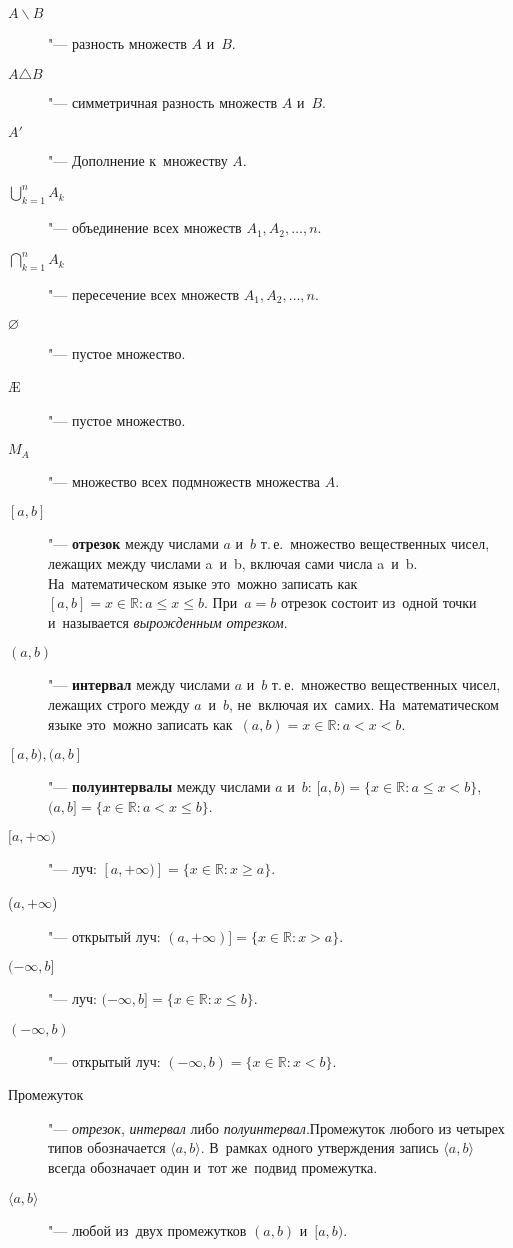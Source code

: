 \documentclass[]{scrartcl}
\begin{document}
\begin{description}
	\item[$A \backslash B$] "--- разность множеств $A$ и~$B$.
	\item[$A \triangle B$] "--- симметричная разность множеств $A$ и~$B$.
	\item[$A'$] "--- Дополнение к~множеству $A$.
	\item[$\bigcup \limits_{k=1}^{n}A_k$] "--- объединение всех множеств $A_1, A_2,\ldots, n$.
	\item[$\bigcap \limits_{k=1}^{n}A_k$] "--- пересечение всех множеств $A_1, A_2,\ldots, n$.
	\item[$\varnothing$] "--- пустое множество.
	\item[\AE{}] "--- пустое множество.
	\item[$M_A$] "--- множество всех подмножеств множества $A$.
	\item[{$\left[ a,b \right]$}] "--- \textbf{отрезок} между числами $a$ и~$b$ т.\,е.~множество вещественных чисел, лежащих между числами a~и~b, включая сами числа a~и~b. На~математическом языке это~можно записать как~$[a, b] = {x \in \mathbb{R}: a \leq x \leq b }$. При~$a=b$ отрезок состоит из~одной точки и~называется \emph{вырожденным отрезком}.
	\item[$(a, b)$] "--- \textbf{интервал} между числами $a$ и~$b$ т.\,е.~множество вещественных чисел, лежащих строго между $a$~и~$b$, не~включая их~самих. На~математическом языке это~можно записать как~$(a, b) = {x \in \mathbb{R}: a < x < b }$.
	\item[{$\left[ a, b), (a, b\right] $}] "--- \textbf{полуинтервалы} между числами $a$ и~$b$: $[a,b) = \{x \in \mathbb{R}: a \leq x < b\}$, $(a,b] = \{x \in \mathbb{R}: a < x \leq b\}$.
	\item[$[a, +\infty)$] "--- луч: $[a, +\infty)] = \{x \in \mathbb{R}: x \geq a\}$.
	\item[($a, +\infty$)] "--- открытый луч: $(a, +\infty)] = \{x \in \mathbb{R}: x > a \}$.
	\item[{$(-\infty, b]$}] "--- луч: $(- \infty, b] = \{x \in \mathbb{R}: x \leq b\}$.
	\item[$(-\infty, b)$] "--- открытый луч: $(-\infty, b) = \{x \in \mathbb{R}: x < b\}$.
	\item[Промежуток] "--- \emph{отрезок}, \emph{интервал} либо \emph{полуинтервал}.Промежуток любого из четырех типов обозначается $\langle a, b \rangle$. В~рамках одного утверждения запись $\langle a, b \rangle$ всегда обозначает один и~тот же~подвид промежутка.
	\item[$\langle a, b \rangle$] "--- любой из~двух промежутков  $(a,b)$ и~$[a,b)$.

\end{description}
\end{document}
